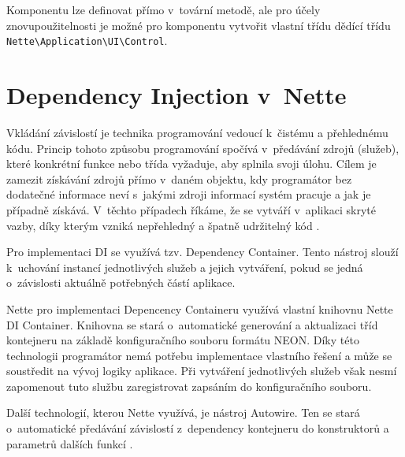 \documentclass[czech,BP]{thesiskiv}
\begin{document}
		\par Komponentu lze definovat přímo v~tovární metodě, ale pro účely znovupoužitelnosti je možné pro komponentu vytvořit vlastní třídu dědící třídu \texttt{Nette\textbackslash Application\textbackslash UI\textbackslash Control}.
		
		\section{Dependency Injection v~Nette}
		\par Vkládání závislostí je technika programování vedoucí k~čistému a přehlednému kódu. Princip tohoto způsobu programování spočívá v~předávání zdrojů (služeb), které konkrétní funkce nebo třída vyžaduje, aby splnila svoji úlohu. Cílem je zamezit získávání zdrojů přímo v~daném objektu, kdy programátor bez dodatečné informace neví s~jakými zdroji informací systém pracuje a jak je případně získává. V~těchto případech říkáme, že se vytváří v~aplikaci skryté vazby, díky kterým vzniká nepřehledný a špatně udržitelný kód \cite{PHP-DI}.
		\par Pro implementaci DI se využívá tzv. Dependency Container. Tento nástroj slouží k~uchování instancí jednotlivých služeb a jejich vytváření, pokud se jedná o~závislosti aktuálně potřebných částí aplikace.
		\par Nette pro implementaci Depencency Containeru využívá vlastní knihovnu Nette DI Container. Knihovna se stará o~automatické generování a aktualizaci tříd kontejneru na základě konfiguračního souboru formátu NEON. Díky této technologii programátor nemá potřebu implementace vlastního řešení a může se soustředit na vývoj logiky aplikace. Při vytváření jednotlivých služeb však nesmí zapomenout tuto službu zaregistrovat zapsáním do konfiguračního souboru.
		\par Další technologií, kterou Nette využívá, je nástroj Autowire. Ten se stará o~automatické předávání závislostí z~dependency kontejneru do konstruktorů a parametrů dalších funkcí \cite{NetteDI}.
		
\end{document}
